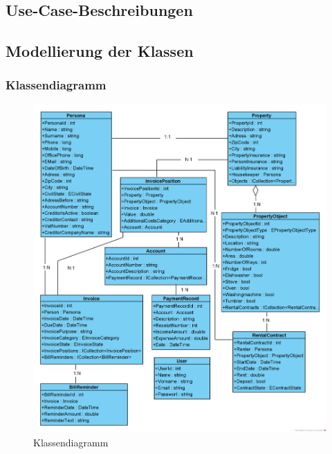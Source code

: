 \subsection{Use-Case-Beschreibungen}


\newpage
\subsection{Modellierung der Klassen}
\subsubsection{Klassendiagramm}

\begin{figure}[H]
  \begin{center}
    \includegraphics[width=1\linewidth]{content/diagrams/out/classdiagram/classdiagram.png}
    \caption{Klassendiagramm}
    \label{classdiagramm}
  \end{center}
\end{figure}

